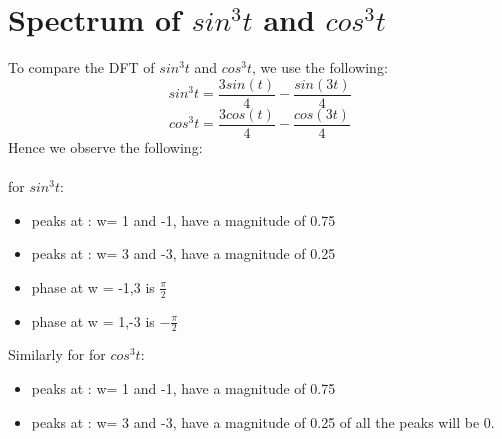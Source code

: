 \documentclass[11pt]{article}
\begin{document}
\section{Spectrum of $sin^3t$ and $cos^3t$}
To compare the DFT of $sin^3t$ and $cos^3t$, we use the following:
\begin{equation}
    sin^3t = \frac{3sin(t)}{4} - \frac{sin(3t)}{4}
\end{equation}
\begin{equation}
    cos^3t = \frac{3cos(t)}{4} - \frac{cos(3t)}{4}
\end{equation}
Hence we observe the following:\\~\\
for $sin^3t$:
\begin{itemize}
    \item peaks at : w= 1 and -1, have a magnitude of 0.75
    \item peaks at : w= 3 and -3, have a magnitude of 0.25
    \item phase at w = -1,3 is $\frac{\pi}{2}$
    \item phase at w = 1,-3 is $-\frac{\pi}{2}$
\end{itemize}
Similarly for for $cos^3t$:
\begin{itemize}
    \item peaks at : w= 1 and -1, have a magnitude of 0.75
    \item peaks at : w= 3 and -3, have a magnitude of 0.25
    \phase of all the peaks will be 0.
\end{itemize}
\end{document}
